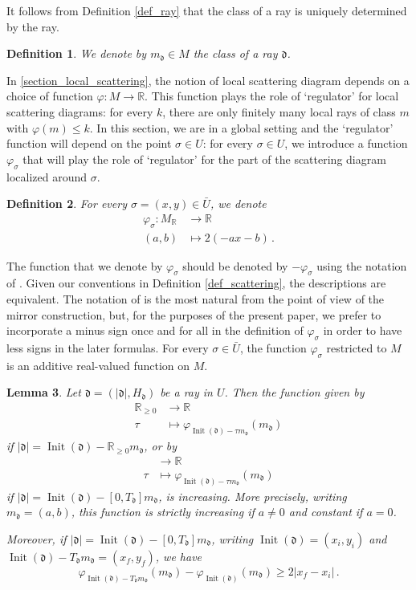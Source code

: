 \documentclass[12pt, a4paper]{amsart}
\newtheorem{defn}{Definition}[section]
\newtheorem{lem}[defn]{Lemma}
\newcommand\R{\mathbb R}
\newcommand\fd{\mathfrak d}
\newcommand\Init{\operatorname{Init}}
\begin{document}
It follows from Definition 
\ref{def_ray} that the class of a ray is uniquely determined by the ray. 

\begin{defn}
We denote by
$m_\fd \in M$ the class of a ray $\fd$.
\end{defn}

In \cref{section_local_scattering}, the notion of local scattering diagram depends on a choice of function $\varphi \colon M \rightarrow \R$.
This function plays the role of `regulator' for local scattering diagrams: for every $k$, there are only finitely many local rays of class $m$
with $\varphi(m) \leq k$. In this section, we are in a global setting and 
the `regulator' function will depend on the point 
$\sigma \in U$: for every $\sigma \in U$, we introduce a function 
$\varphi_\sigma$ that will play the role of `regulator' for the part of the 
scattering diagram localized around $\sigma$.

\begin{defn} \label{def_varphi}
For every $\sigma=(x,y) \in \bar{U}$, we denote
\begin{align*} \varphi_\sigma \colon M_\R &\longrightarrow \R \\
(a,b) &\longmapsto 2(-ax-b) \,.\end{align*}
\end{defn}


The function that we denote by $\varphi_\sigma$ should be denoted by
$-\varphi_\sigma$ using the notation of \cite{MR2846484, MR2722115}. Given our conventions in 
Definition \ref{def_scattering}, the descriptions are equivalent. The notation of \cite{MR2846484, MR2722115} is the most natural from the point of view of the mirror construction, but, for the purposes of the present paper, we prefer to incorporate a minus sign once and for all in the definition of $\varphi_\sigma$ in order to have less signs in the later formulas. 
For every $\sigma \in \bar{U}$, the function
$\varphi_\sigma$ restricted to $M$ is an additive real-valued function on $M$.



\begin{lem}\label{lem_increasing}
Let $\fd=(|\fd|,H_\fd)$ be a ray in $U$.
Then the function given by 
\begin{align*}
\R_{\geqslant 0} &\longrightarrow \R\\
\tau &\longmapsto \varphi_{\Init(\fd)-\tau m_\fd}(m_\fd)
\end{align*}
if $|\fd|=\Init(\fd)-\R_{\geqslant 0}m_\fd$, or by 
\begin{align*}
[0,T_\fd] &\longrightarrow \R\\ 
\tau &\longmapsto \varphi_{\Init(\fd)-\tau m_\fd}(m_\fd)\end{align*}
if $|\fd|=\Init(\fd)-[0,T_\fd]m_\fd$,
is increasing. More precisely, writing
$m_\fd=(a,b)$, this function is strictly increasing if $a \neq 0$ and constant if $a=0$.

Moreover, if $|\fd|=\Init(\fd)-[0,T_\fd]m_\fd$, writing $\Init(\fd)=(x_i,y_i)$ and 
$\Init(\fd)-T_\fd m_\fd=(x_f,y_f)$, we have 
\[ \varphi_{\Init(\fd) -T_\fd m_\fd}(m_\fd)
-\varphi_{\Init(\fd)}(m_\fd) \geqslant 2|x_f-x_i|\,.\]
\end{lem}
\end{document}
